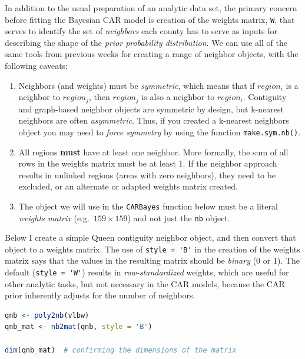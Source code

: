 \documentclass[
]{book}
\newcommand{\passthrough}[1]{#1}
\providecommand{\tightlist}{%
  \setlength{\itemsep}{0pt}\setlength{\parskip}{0pt}}
\begin{document}
In addition to the usual preparation of an analytic data set, the primary concern before fitting the Bayesian CAR model is creation of the weights matrix, \passthrough{\lstinline!W!}, that serves to identify the set of \emph{neighbors} each county has to serve as inputs for describing the shape of the \emph{prior probability distribution}. We can use all of the same tools from previous weeks for creating a range of neighbor objects, with the following caveats:

\begin{enumerate}
\def\labelenumi{\arabic{enumi}.}
\tightlist
\item
  Neighbors (and weights) must be \emph{symmetric}, which means that if \(region_i\) is a neighbor to \(region_j\), then \(region_j\) is also a neighbor to \(region_i\). Contiguity and graph-based neighbor objects are symmetric by design, but k-nearest neighbors are often \emph{asymmetric}. Thus, if you created a k-nearest neighbors object you may need to \emph{force symmetry} by using the function \passthrough{\lstinline!make.sym.nb()!}.
\item
  All regions \textbf{must} have at least one neighbor. More formally, the sum of all rows in the weights matrix must be at least 1. If the neighbor approach results in unlinked regions (areas with zero neighbors), they need to be excluded, or an alternate or adapted weights matrix created.
\item
  The object we will use in the \passthrough{\lstinline!CARBayes!} function below must be a literal \emph{weights matrix} (e.g.~\(159 \times 159\)) and not just the \passthrough{\lstinline!nb!} object.
\end{enumerate}

Below I create a simple Queen contiguity neighbor object, and then convert that object to a weights matrix. The use of \passthrough{\lstinline!style = 'B'!} in the creation of the weights matrix says that the values in the resulting matrix should be \emph{binary} (0 or 1). The default (\passthrough{\lstinline!style = 'W'!}) results in \emph{row-standardized} weights, which are useful for other analytic tasks, but not necessary in the CAR models, because the CAR prior inherently adjusts for the number of neighbors.

\begin{lstlisting}[language=R]
qnb <- poly2nb(vlbw)
qnb_mat <- nb2mat(qnb, style = 'B')

dim(qnb_mat)  # confirming the dimensions of the matrix
\end{lstlisting}
\end{document}
